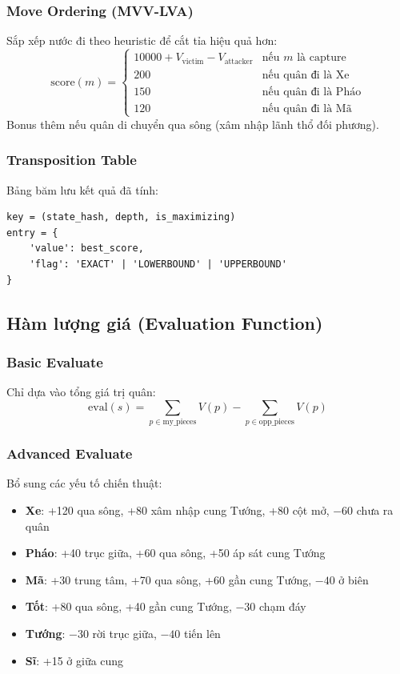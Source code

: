 \subsubsection{Move Ordering (MVV-LVA)}
Sắp xếp nước đi theo heuristic để cắt tỉa hiệu quả hơn:
\begin{equation}
    \text{score}(m) = \begin{cases}
        10000 + V_{\text{victim}} - V_{\text{attacker}} & \text{nếu } m \text{ là capture} \\
        200 & \text{nếu quân đi là Xe} \\
        150 & \text{nếu quân đi là Pháo} \\
        120 & \text{nếu quân đi là Mã}
    \end{cases}
\end{equation}
Bonus thêm nếu quân di chuyển qua sông (xâm nhập lãnh thổ đối phương).

\subsubsection{Transposition Table}
Bảng băm lưu kết quả đã tính:
\begin{lstlisting}[caption=Cấu trúc Transposition Table entry]
key = (state_hash, depth, is_maximizing)
entry = {
    'value': best_score,
    'flag': 'EXACT' | 'LOWERBOUND' | 'UPPERBOUND'
}
\end{lstlisting}

\subsection{Hàm lượng giá (Evaluation Function)}

\subsubsection{Basic Evaluate}
Chỉ dựa vào tổng giá trị quân:
\begin{equation}
    \text{eval}(s) = \sum_{p \in \text{my\_pieces}} V(p) - \sum_{p \in \text{opp\_pieces}} V(p)
\end{equation}

\subsubsection{Advanced Evaluate}
Bổ sung các yếu tố chiến thuật:
\begin{itemize}
    \item \textbf{Xe}: +120 qua sông, +80 xâm nhập cung Tướng, +80 cột mở, $-60$ chưa ra quân
    \item \textbf{Pháo}: +40 trục giữa, +60 qua sông, +50 áp sát cung Tướng
    \item \textbf{Mã}: +30 trung tâm, +70 qua sông, +60 gần cung Tướng, $-40$ ở biên
    \item \textbf{Tốt}: +80 qua sông, +40 gần cung Tướng, $-30$ chạm đáy
    \item \textbf{Tướng}: $-30$ rời trục giữa, $-40$ tiến lên
    \item \textbf{Sĩ}: +15 ở giữa cung
\end{itemize}

